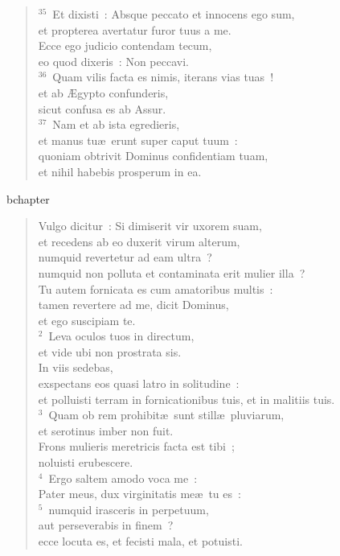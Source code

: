 \begin{flushleft}
\begin{verse}
${}^{35}$~Et dixisti~: Absque peccato et innocens ego sum,\\ et propterea avertatur furor tuus a me.\\ Ecce ego judicio contendam tecum,\\ eo quod dixeris~: Non peccavi.\\
${}^{36}$~Quam vilis facta es nimis, iterans vias tuas~!\\ et ab \AE gypto confunderis,\\ sicut confusa es ab Assur.\\
${}^{37}$~Nam et ab ista egredieris,\\ et manus tu\ae\ erunt super caput tuum~:\\ quoniam obtrivit Dominus confidentiam tuam,\\ et nihil habebis prosperum in ea.\end{verse}\end{flushleft}


bchapter\begin{flushleft}\begin{verse}\vspace{-19pt}Vulgo dicitur~: Si dimiserit vir uxorem suam,\\ et recedens ab eo duxerit virum alterum,\\ numquid revertetur ad eam ultra~?\\ numquid non polluta et contaminata erit mulier illa~?\\ Tu autem fornicata es cum amatoribus multis~:\\ tamen revertere ad me, dicit Dominus,\\ et ego suscipiam te.\\
${}^{2}$~Leva oculos tuos in directum,\\ et vide ubi non prostrata sis.\\ In viis sedebas,\\ exspectans eos quasi latro in solitudine~:\\ et polluisti terram in fornicationibus tuis, et in malitiis tuis.\\
${}^{3}$~Quam ob rem prohibit\ae\ sunt still\ae\ pluviarum,\\ et serotinus imber non fuit.\\ Frons mulieris meretricis facta est tibi~;\\ noluisti erubescere.\\
${}^{4}$~Ergo saltem amodo voca me~:\\ Pater meus, dux virginitatis me\ae\ tu es~:\\
${}^{5}$~numquid irasceris in perpetuum,\\ aut perseverabis in finem~?\\ ecce locuta es, et fecisti mala, et potuisti.\end{verse}\end{flushleft}


